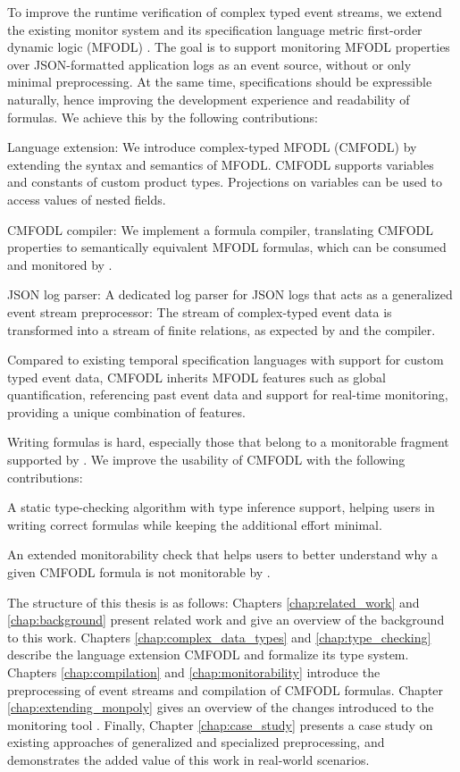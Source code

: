 To improve the runtime verification of complex typed event streams, we extend the existing monitor system \MonPoly \cite{basinMonPolyMonitoringTool2017} and its specification language metric first-order dynamic logic (MFODL) \cite{basinFormallyVerifiedOptimized2020}. The goal is to support monitoring MFODL properties over JSON-formatted application logs as an event source, without or only minimal preprocessing. At the same time, specifications should be expressible naturally, hence improving the development experience and readability of formulas. We achieve this by the following contributions:
\begin{compactitem}
	\item Language extension: We introduce complex-typed MFODL (CMFODL) by extending the syntax and semantics of MFODL. CMFODL supports variables and constants of custom product types. Projections on variables can be used to access values of nested fields.
	\item CMFODL compiler: We implement a formula compiler, translating CMFODL properties to semantically equivalent MFODL formulas, which can be consumed and monitored by \MonPolyN.
	\item JSON log parser: A dedicated log parser for JSON logs that acts as a generalized event stream preprocessor: The stream of complex-typed event data is transformed into a stream of finite relations, as expected by \MonPoly and the compiler.
\end{compactitem}
Compared to existing temporal specification languages with support for custom typed event data, CMFODL inherits MFODL features such as global quantification, referencing past event data and support for real-time monitoring, providing a unique combination of features.

Writing formulas is hard, especially those that belong to a monitorable fragment supported by \MonPolyN. We improve the usability of CMFODL with the following contributions:
\begin{compactitem}
	\item A static type-checking algorithm with type inference support, helping users in writing correct formulas while keeping the additional effort minimal.
	\item An extended monitorability check that helps users to better understand why a given CMFODL formula is not monitorable by \MonPolyN.
\end{compactitem}

The structure of this thesis is as follows: Chapters \ref{chap:related_work} and \ref{chap:background} present related work and give an overview of the background to this work. Chapters \ref{chap:complex_data_types} and \ref{chap:type_checking} describe the language extension CMFODL and formalize its type system. Chapters \ref{chap:compilation} and \ref{chap:monitorability} introduce the preprocessing of event streams and compilation of CMFODL formulas. Chapter \ref{chap:extending_monpoly} gives an overview of the changes introduced to the monitoring tool \MonPolyN. Finally, Chapter \ref{chap:case_study} presents a case study on existing approaches of generalized and specialized preprocessing, and demonstrates the added value of this work in real-world scenarios.

